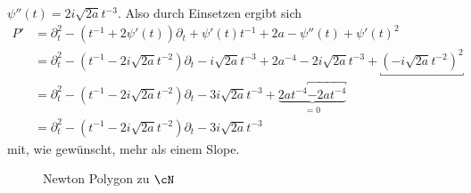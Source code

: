 $\psi''(t)=2i\sqrt{2a}t^{-3}$. Also durch Einsetzen ergibt sich
\begin{align*}
P' &= \partial_t^2 - (t^{-1} + 2\psi'(t))\partial_t
    + \psi'(t)t^{-1} + 2a -\psi''(t)
    + \psi'(t)^2
\\&= \partial_t^2 - (t^{-1} - 2i\sqrt{2a}t^{-2})\partial_t - i\sqrt{2a}t^{-3}
    + 2a^{-4} - 2i\sqrt{2a}t^{-3} + \underbracket{(-i\sqrt{2a}t^{-2})^2}
\\&= \partial_t^2 - (t^{-1} - 2i\sqrt{2a}t^{-2})\partial_t - 3i\sqrt{2a}t^{-3}
  + \underset{=0}{\underbrace{ 2at^{-4} \overbracket{- 2at^{-4}}}}
\\&= \partial_t^2 - (t^{-1} - 2i\sqrt{2a}t^{-2})\partial_t - 3 i\sqrt{2a}t^{-3}
\end{align*}
mit, wie gewünscht, mehr als einem Slope.
\begin{figure}[H]
\begin{center}
\end{center}
\caption{Newton Polygon zu $\cN$}
\end{figure}
\begin{comment}
Alternative berechnung: mit Formel aus \cite[Seite 44]{DiplHedwig}
\[
P'(t,\partial_t)=\rho^*P(t,\partial_t-\frac{\partial \psi}{\partial t})
\]
es ist $\rho^*P(t,\partial_t)=t^4\partial_t^2-t^3\partial_t+2a$, und somit
\begin{align*}
P'(t,\partial_t) &= \rho^*P(t,\partial_t-\frac{\partial \psi}{\partial t})
\\&=\rho^*P(t,\partial_t-\frac{-i\sqrt{2a}}{t^2})
\\&= t^4\underbracket{(\partial_t+\frac{i\sqrt{2a}}{t^2})^2}
    \underbracket{- t^3(\partial_t+\frac{i\sqrt{2a}}{t^2})} + 2a
\\&= t^4 \overbracket{\underbracket{
      (\partial_t+i\sqrt{2a}t^{-2})(\partial_t+i\sqrt{2a}t^{-2})
    }} \overbracket{ - t^3\partial_t - i\sqrt{2a}t} + 2a
\\&= t^4 \overbracket{ (\partial_t^2 + i\sqrt{2a}t^{-2}\partial_t
      +\partial_ti\sqrt{2a}t^{-2} + \underbracket{(i\sqrt{2a}t^{-2})^2)}
    } - t^3\partial_t - i\sqrt{2a}t + 2a
\\&= t^4\partial_t^2 + i\sqrt{2a}t^{2}\partial_t
    + i\sqrt{2a}t^4\underbracket{\partial_tt^{-2}} \overbracket{-2at^{-4}}t^4
    - t^3\partial_t
    - i\sqrt{2a}t + 2a
\\&= t^4\partial_t^2 + i\sqrt{2a}t^{2}\partial_t
    + i\sqrt{2a}t^4\overbracket{(t^{-2}\partial_t-2t^{-3})} - t^3\partial_t
    - i\sqrt{2a}t
\\&= t^4\partial_t^2 + i\sqrt{2a}t^{2}\partial_t + i\sqrt{2a}t^2\partial_t
    - 2i\sqrt{2a}t - t^3\partial_t - i\sqrt{2a}t
\\&= t^4\partial_t^2 - (t^3-2i\sqrt{2a}t^{2})\partial_t - 3i\sqrt{2a}t
\end{align*}
\end{comment}

